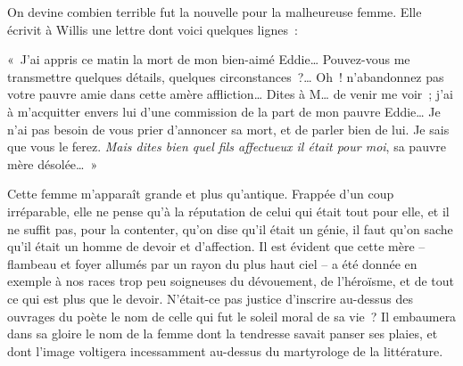 \documentclass[french,twoside]{book} %
\begin{document}
On devine combien terrible fut la nouvelle pour la malheureuse femme. Elle écrivit à Willis une lettre dont voici quelques lignes :\par
« J’ai appris ce matin la mort de mon bien-aimé Eddie… Pouvez-vous me transmettre quelques détails, quelques circonstances ?… Oh ! n’abandonnez pas votre pauvre amie dans cette amère affliction… Dites à M… de venir me voir ; j’ai à m’acquitter envers lui d’une commission de la part de mon pauvre Eddie… Je n’ai pas besoin de vous prier d’annoncer sa mort, et de parler bien de lui. Je sais que vous le ferez. \emph{Mais dites bien quel fils affectueux il était pour moi}, sa pauvre mère désolée… »\par
Cette femme m’apparaît grande et plus qu’antique. Frappée d’un coup irréparable, elle ne pense qu’à la réputation de celui qui était tout pour elle, et il ne suffit pas, pour la contenter, qu’on dise qu’il était un génie, il faut qu’on sache qu’il était un homme de devoir et d’affection. Il est évident que cette mère – flambeau et foyer allumés par un rayon du plus haut ciel – a été donnée en exemple à nos races trop peu soigneuses du dévouement, de l’héroïsme, et de tout ce qui est plus que le devoir. N’était-ce pas justice d’inscrire au-dessus des ouvrages du poète le nom de celle qui fut le soleil moral de sa vie ? Il embaumera dans sa gloire le nom de la femme dont la tendresse savait panser ses plaies, et dont l’image voltigera incessamment au-dessus du martyrologe de la littérature.
\end{document}
